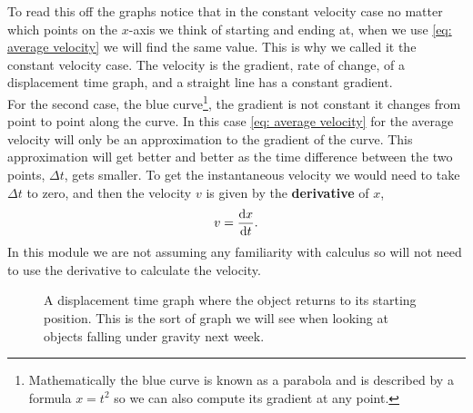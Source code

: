 \documentclass[a4paper,12pt]{book}
\begin{document}
To read this off the graphs notice that in the constant velocity case no matter which points on the $x$-axis we think of starting and ending at, when we use \cref{eq: average velocity} we will find the same value. This is why we called it the constant velocity case. The velocity is the gradient, rate of change, of a displacement time graph, and a straight line has a constant gradient.\\

For the second case, the blue curve\footnote{Mathematically the blue curve is known as a parabola and is described by a formula $x=t^{2}$ so we can also compute its gradient at any point.}, the gradient is not constant it changes from point to point along the curve. In this case \cref{eq: average velocity} for the average velocity will only be an approximation to the gradient of the curve. This approximation will get better and better as the time difference between the two points, $\Delta t$, gets smaller. To get the instantaneous velocity we would need to take $\Delta t$ to zero, and then the velocity $v$ is given by the \textbf{derivative} of $x$,
\begin{equation*}
    v=\frac{\mathrm{d} x}{\mathrm{d} t}.
\end{equation*}
In this module we are not assuming any familiarity with calculus so will not need to use the derivative to calculate the velocity. 

\begin{figure}[ht]
    \centering
    \caption{A displacement time graph where the object returns to its starting position. This is the sort of graph we will see when looking at objects falling under gravity next week.}
    \label{fig: displacement time graph 2}
\end{figure}
\end{document}
